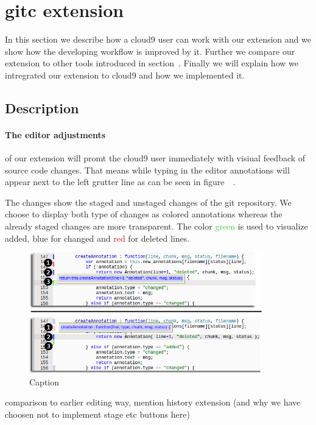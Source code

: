 \section{gitc extension}
\label{sec:Extension}
In this section we describe how a cloud9 user can work with our extension and we show how the developing workflow is improved by it.
Further we compare our extension to other tools introduced in section~.
Finally we will explain how we intregrated our extension to cloud9 and how we implemented it.

\subsection{Description}
\paragraph{The editor adjustments} of our extension will promt the cloud9 user immediately with visiual feedback of source code changes.
That means while typing in the editor annotations will appear next to the left grutter line as can be seen in figure~\needcite ~.

The changes show the staged and unstaged changes of the git repository.
We choose to display both type of changes as colored annotations whereas the already staged changes are more transparent. 
The color \textcolor{LimeGreen}{green} is used to visualize added, \textcolor{ProcessBlue}{blue} for changed and \textcolor{Red}{red} for deleted lines.

\begin{figure}
   \centering
   \includegraphics[width=0.9\textwidth]{images/extension_tooltip_comparison.png}
   \caption{Caption}
   \label{fig:editor}
\end{figure}

comparison to earlier editing way, mention history extension (and why we have choosen not to implement stage etc buttons here)

